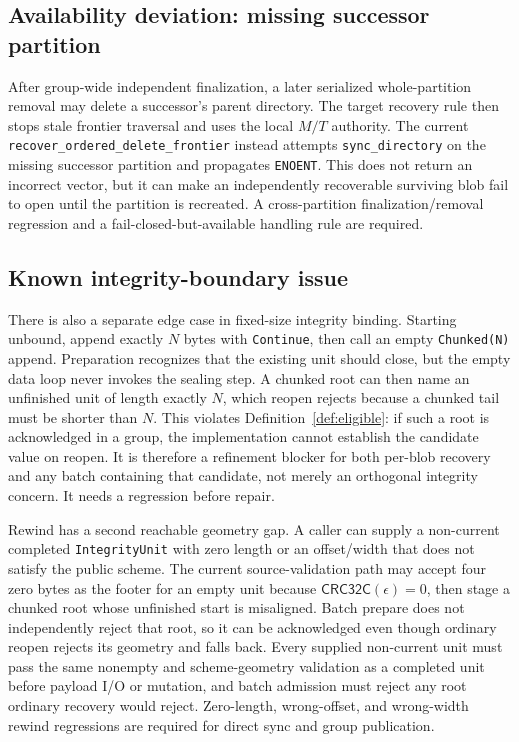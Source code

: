 \documentclass[10pt,twocolumn]{article}
\theoremstyle{remark}
\newcommand{\code}[1]{\texttt{#1}}
\newcommand{\crc}{\mathsf{CRC32C}}
\begin{document}
\subsection{Availability deviation: missing successor partition}

After group-wide independent finalization, a later serialized whole-partition removal may delete a
successor's parent directory. The target recovery rule then stops stale frontier traversal and uses
the local $M/T$ authority. The current \code{recover\_ordered\_delete\_frontier} instead attempts
\code{sync\_directory} on the missing successor partition and propagates \code{ENOENT}. This does not
return an incorrect vector, but it can make an independently recoverable surviving blob fail to
open until the partition is recreated. A cross-partition finalization/removal regression and a
fail-closed-but-available handling rule are required.

\subsection{Known integrity-boundary issue}

There is also a separate edge case in fixed-size integrity binding. Starting unbound, append exactly
$N$ bytes with \code{Continue}, then call an empty \code{Chunked(N)} append. Preparation recognizes
that the existing unit should close, but the empty data loop never invokes the sealing step. A
chunked root can then name an unfinished unit of length exactly $N$, which reopen rejects because a
chunked tail must be shorter than $N$. This violates Definition~\ref{def:eligible}: if such a root is
acknowledged in a group, the implementation cannot establish the candidate value on reopen. It is
therefore a refinement blocker for both per-blob recovery and any batch containing that candidate,
not merely an orthogonal integrity concern. It needs a regression before repair.

Rewind has a second reachable geometry gap. A caller can supply a non-current completed
\code{IntegrityUnit} with zero length or an offset/width that does not satisfy the public scheme.
The current source-validation path may accept four zero bytes as the footer for an empty unit
because $\crc(\epsilon)=0$, then stage a chunked root whose unfinished start is misaligned. Batch
prepare does not independently reject that root, so it can be acknowledged even though ordinary
reopen rejects its geometry and falls back. Every supplied non-current unit must pass the same
nonempty and scheme-geometry validation as a completed unit before payload I/O or mutation, and
batch admission must reject any root ordinary recovery would reject. Zero-length, wrong-offset,
and wrong-width rewind regressions are required for direct sync and group publication.
\end{document}
